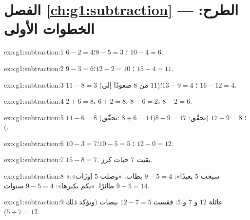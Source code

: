 \section*{الفصل \ref{ch:g1:subtraction} --- الطرح: الخطوات الأولى}

\begin{solution}{exo:g1:subtraction:1}
$6 - 2 = 4$؛ \quad $8 - 5 = 3$؛ \quad $10 - 4 = 6$.
\end{solution}

\begin{solution}{exo:g1:subtraction:2}
$9 - 3 = 6$؛ \quad $12 - 2 = 10$؛ \quad $15 - 4 = 11$.
\end{solution}

\begin{solution}{exo:g1:subtraction:3}
$11 - 8 = 3$ (من $8$ صعودًا إلى $11$)؛ \quad
$13 - 9 = 4$؛ \quad $16 - 12 = 4$.
\end{solution}

\begin{solution}{exo:g1:subtraction:4}
$2 + 6 = 8$، \quad $6 + 2 = 8$، \quad $8 - 6 = 2$، \quad
$8 - 2 = 6$.
\end{solution}

\begin{solution}{exo:g1:subtraction:5}
$14 - 6 = 8$ (تحقّق: $8 + 6 = 14$)؛ \quad
$17 - 9 = 8$ (تحقّق: $8 + 9 = 17$).
\end{solution}

\begin{solution}{exo:g1:subtraction:6}
$10 - 3 = 7$؛ \quad $10 - 5 = 5$؛ \quad $12 - 0 = 12$.
\end{solution}

\begin{solution}{exo:g1:subtraction:7}
$15 - 8 = 7$. بقيت $7$ حبات كرز.
\end{solution}

\begin{solution}{exo:g1:subtraction:8}
«سبحت $5$ بعيدًا»: $9 - 5 = 4$ بطات. «وصلت $5$ إوزّات»:
$9 + 5 = 14$ طائرًا. «بكم يكبرها»: $9 - 5 = 4$ سنوات.
\end{solution}

\begin{solution}{exo:g1:subtraction:9}
عائلة $12$ و $7$ و $5$: فقست $12 - 7 = 5$ بيضات (ويؤكد ذلك
$5 + 7 = 12$).
\end{solution}
